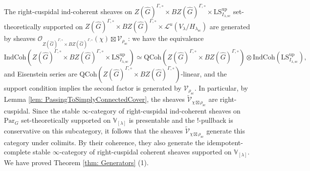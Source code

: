 \documentclass{amsart}
\theoremstyle{definition}
\theoremstyle{remark}
\numberwithin{equation}{section}
\newcommand{\mc}{\mathcal}
\newcommand{\Sc}{\mathrm{sc}}
\newcommand{\wh}{\widehat}
\newcommand{\Par}{\mathrm{Par}}
\newcommand{\IndCoh}{\mathrm{IndCoh}}
\newcommand{\QCoh}{\mathrm{QCoh}}
\newcommand{\V}{\mathbb{V}}
\newcommand{\up}{\mathrm{up}}
\newcommand{\LS}{\mathrm{LS}}
\begin{document}
The right-cuspidal ind-coherent sheaves on $Z(\wh G)^{\Gamma, \circ}\times BZ(\wh G)^{\Gamma, \circ} \times \LS_{I_{\lambda, \Sc}}^\up$ set-theoretically supported on $Z(\wh G)^{\Gamma, \circ}\times BZ(\wh G)^{\Gamma, \circ}\times \mc L^u(V_\lambda /H_{\lambda_\Sc})$ are generated by sheaves $\mc O_{Z(\wh G)^{\Gamma, \circ}\times BZ(\wh G)^{\Gamma, \circ}}(\chi)\boxtimes \mc V_{\rho_\Sc}$: we have the equivalence
\[
\IndCoh(Z(\wh G)^{\Gamma,\circ}\times BZ(\wh G)^{\Gamma,\circ} \times \LS^\up_{I_{\lambda,\Sc}}) \simeq
\QCoh(Z(\wh G)^{\Gamma,\circ}\times BZ(\wh G)^{\Gamma,\circ}) \otimes \IndCoh(\LS^\up_{I_{\lambda,\Sc}}), 
\]
and Eisenstein series are $\QCoh(Z(\wh G)^{\Gamma,\circ}\times BZ(\wh G)^{\Gamma,\circ})$-linear, and the support condition implies the second factor is generated by $\mc V_{\rho_\Sc}$. In particular, by Lemma \ref{lem: PassingToSimplyConnectedCover}, the sheaves $\widetilde{\mc V}_{\chi\boxtimes \rho_\Sc}$ are right-cuspidal. Since the stable $\infty$-category of right-cuspidal ind-coherent sheaves on $\Par_G$ set-theoretically supported on $\V_{[\lambda]}$ is presentable and the $!$-pullback is conservative on this subcategory, it follows that the sheaves $\widetilde{\mc V}_{\chi\boxtimes \rho_\Sc}$ generate this category under colimits. By their coherence, they also generate the idempotent-complete stable $\infty$-category of right-cuspidal coherent sheaves supported on $\V_{[\lambda]}$. We have proved Theorem \ref{thm: Generators} (1).
\end{document}
